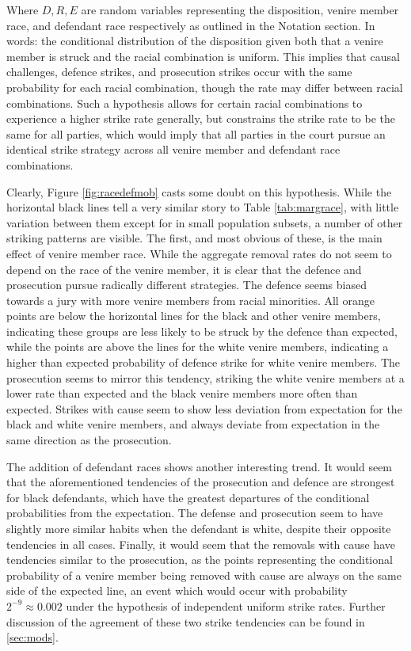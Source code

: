 Where $D, R, E$ are random variables representing the disposition, venire member race, and defendant race respectively as outlined
in the Notation section. In words: the conditional distribution of the
disposition given both that a venire member is struck and the racial combination
is uniform. This implies that causal challenges, defence strikes, and prosecution strikes occur with the same probability for each
racial combination, though the rate may differ between racial combinations. Such a hypothesis allows for certain racial
combinations to experience a higher strike rate generally, but constrains the strike rate to be the same for all parties, which
would imply that all parties in the court pursue an identical strike strategy across all venire member and defendant race
combinations.

Clearly, Figure \ref{fig:racedefmob} casts some doubt on this hypothesis. While the horizontal black lines tell a very similar
story to Table \ref{tab:margrace}, with little variation between them except for in small population subsets, a number of other
striking patterns are visible. The first, and most obvious of these, is the main effect of venire member race. While the aggregate
removal rates do not seem to depend on the race of the venire member, it is clear that the defence and prosecution pursue
radically different strategies. The defence seems biased towards a jury with more venire members from racial minorities. All
orange points are below the horizontal lines for the black and other venire members, indicating these groups are less likely to be
struck by the defence than expected, while the points are above the lines for the white venire members, indicating a higher than
expected probability of defence strike for white venire members. The prosecution seems to mirror this tendency, striking the
white venire members at a lower rate than expected and the black venire members more often than expected. Strikes with cause
seem to show less deviation from expectation for the black and white venire members, and always deviate from expectation
in the same direction as the prosecution.

The addition of defendant races shows another interesting trend. It would seem that the aforementioned tendencies of the
prosecution and defence are strongest for black defendants, which have the greatest departures of the conditional probabilities
from the expectation. The defense and prosecution seem to have slightly more similar habits when the defendant is white, despite
their opposite tendencies in all cases. Finally, it would seem that the removals with cause have tendencies similar to the
prosecution, as the points representing the conditional probability of a venire member being removed with cause are always on the
same side of the expected line, an event which would occur with probability $2^{-9} \approx 0.002$ under the hypothesis of
independent uniform strike rates. Further discussion of the agreement of these two strike tendencies can be found in
\ref{sec:mods}.

